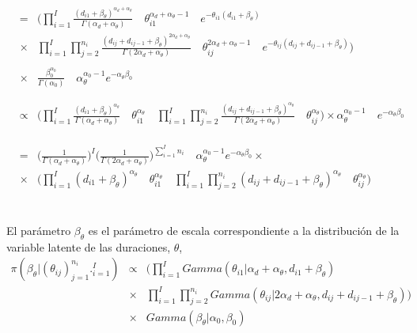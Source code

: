 \begin{eqnarray*}
&=&\Bigg(\prod_{i=1}^I \frac{(d_{i1}+\beta_\theta)^{\alpha_d+\alpha_\theta}}{\Gamma(\alpha_d+\alpha_\theta)} \quad \theta_{i1}^{\alpha_d+\alpha_\theta-1} \quad e^{-\theta_{i1}(d_{i1}+\beta_\theta)}\\
&\times& \prod_{i=1}^I \prod_{j=2}^{n_i} \frac{(d_{ij}+d_{ij-1}+\beta_\theta)^{2\alpha_d+\alpha_\theta}}{\Gamma(2\alpha_d+\alpha_\theta)} \quad \theta_{ij}^{2\alpha_d+\alpha_\theta-1} \quad e^{-\theta_{ij}(d_{ij}+d_{ij-1}+\beta_\theta)}\Bigg) \\
\\
&\times & \frac{\beta_0^{\alpha_0}}{\Gamma(\alpha_0)} \quad \alpha_\theta^{\alpha_0-1} e^{-\alpha_\theta\beta_0}\\
\\
\\
&\propto& \Bigg(\prod_{i=1}^I \frac{(d_{i1}+\beta_\theta)^{\alpha_\theta}}{\Gamma(\alpha_d+\alpha_\theta)} \quad \theta_{i1}^{\alpha_\theta} \quad \prod_{i=1}^I \prod_{j=2}^{n_i} \frac{(d_{ij}+d_{ij-1}+\beta_\theta)^{\alpha_\theta}}{\Gamma(2\alpha_d+\alpha_\theta)}\quad\theta_{ij}^{\alpha_\theta}\Bigg) \times \alpha_\theta^{\alpha_0-1} \quad e^{-\alpha_\theta\beta_0}\\
\\
\\
\\
&=&\Big(\frac{1}{\Gamma(\alpha_d+\alpha_\theta)}\Big)^I \Big(\frac{1}{\Gamma(2\alpha_d+\alpha_\theta)}\Big)^{\sum_{i=1}^I n_i} \quad \alpha_\theta^{\alpha_0-1} e^{-\alpha_\theta\beta_0} \times \\
&\times& \Bigg(\prod_{i=1}^I (d_{i1}+\beta_\theta)^{\alpha_\theta} \quad \theta_{i1}^{\alpha_\theta}\quad \prod_{i=1}^I \prod_{j=2}^{n_i} (d_{ij}+d_{ij-1}+\beta_\theta)^{\alpha_\theta} \quad \theta_{ij}^{\alpha_\theta}\Bigg)
\end{eqnarray*}
\\
\\
El par\'ametro $\beta_\theta$ es el par\'ametro de escala correspondiente a la distribuci\'on de la variable latente de las duraciones, $\theta$,
\begin{eqnarray*}
\pi(\beta_\theta|(\theta_{ij})_{j=1}^{n_i}._{i=1}^I) &\propto& \Big(\prod_{i=1}^I Gamma(\theta_{i1}|\alpha_d+\alpha_\theta, d_{i1}+\beta_\theta)\\
&\times& \prod_{i=1}^I \prod_{j=2}^{n_i} Gamma(\theta_{ij}|2\alpha_d+\alpha_\theta, d_{ij}+d_{ij-1}+\beta_\theta) \Big) \\
&\times& Gamma(\beta_\theta|\alpha_0,\beta_0)\\
\end{eqnarray*}

